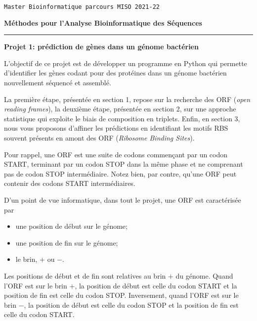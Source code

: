 \documentclass[10pt]{article}
\begin{document}
{\flushright \small \tt Master Bioinformatique parcours MISO 2021-22}

\begin{center}
\textbf{M\'ethodes pour l'Analyse Bioinformatique des S\'equences}

\end{center}


\hrule

\bigskip

\begin{center}

\textbf{\Large Projet 1: prédiction de gènes dans un génome bactérien}    
\end{center}

\bigskip

L'objectif de ce projet est de développer un programme en Python qui permette d'identifier les gènes codant pour des protéines dans un génome bactérien nouvellement séquencé et assemblé. 


La première étape, présentée en section 1, repose sur la recherche des ORF ({\em open reading frames}), la deuxième étape, présentée en section 2, sur une approche statistique qui exploite le biais de composition en triplets. Enfin, en section 3, nous vous proposons d'affiner les prédictions en identifiant les motifs RBS souvent présents en amont des ORF ({\em Ribosome Binding Sites}).

Pour rappel, une ORF est une suite de codons commençant par un codon START, terminant par un codon STOP dans la même phase et ne comprenant pas de codon STOP intermédiaire. Notez bien, par contre, qu'une ORF peut contenir des codons START intermédiaires.

D'un point de vue informatique, dans tout le projet, une ORF est caractérisée par 

\begin{itemize}
\item une position de début sur le génome;
\item une position de fin sur le génome;
\item le brin, $+$ ou $-$.
\end{itemize}

Les positions de début et de fin sont relatives au brin $+$ du génome. Quand l'ORF est sur le brin $+$, la position de début est celle du codon START et la position de 
fin est celle du codon STOP. Inversement, quand l'ORF est sur le brin $-$, la position de début est celle du codon STOP et la position de fin est celle du codon START.
\end{document}
